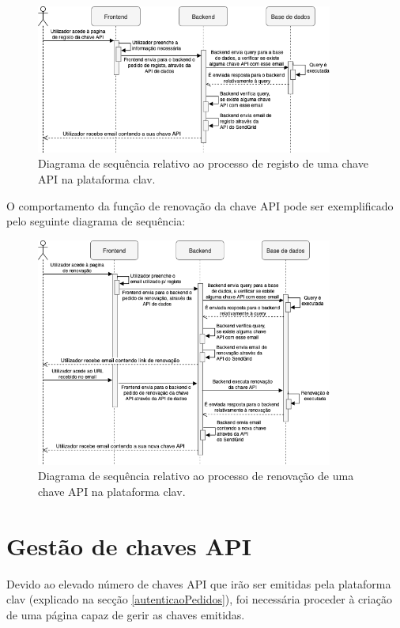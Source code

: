 \begin{figure}[H]
    \centering
    \includegraphics[width=0.87\textwidth]{img/diagramas/sequencia/DiagramasSequencia-RegistoAPI.png}
    \caption{Diagrama de sequência relativo ao processo de registo de uma chave API na plataforma \gls{clav}.}
    \label{fig:diagramaSequenciaRegistoAPI}
\end{figure}
\vspace{-6mm}
O comportamento da função de renovação da chave API pode ser exemplificado pelo seguinte diagrama de sequência:
\vspace{-2mm}
\begin{figure}[H]
    \centering
    \includegraphics[width=0.87\textwidth]{img/diagramas/sequencia/DiagramasSequencia-RenovacaoAPI.png}
    \caption{Diagrama de sequência relativo ao processo de renovação de uma chave API na plataforma \gls{clav}.}
    \label{fig:diagramaSequenciaRenovacaoAPI}
\end{figure}

\cleardoublepage
\section{Gestão de chaves API}
\vspace{-4mm}
Devido ao elevado número de chaves API que irão ser emitidas pela plataforma \gls{clav} (explicado na secção \ref{autenticaoPedidos}), foi necessária proceder à criação de uma página capaz de gerir as chaves emitidas.

